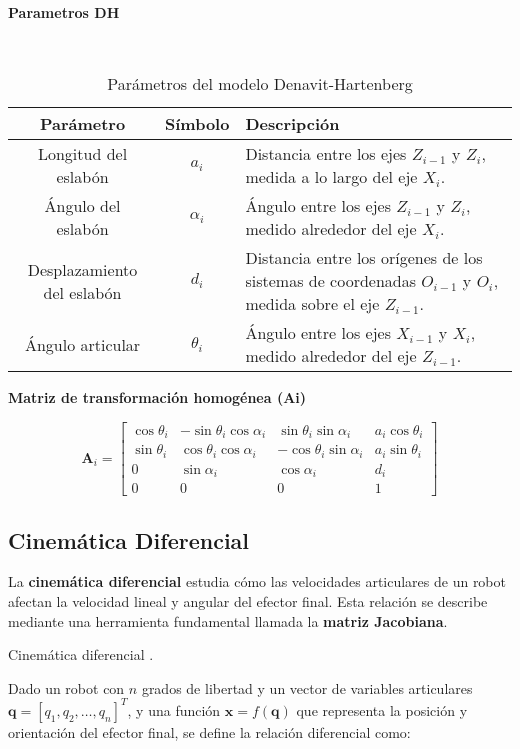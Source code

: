 \textbf{Parametros DH}
\begin{table}[H]\
	\centering
	\begin{tabular}{|c|c|p{9cm}|}
		\hline
		\textbf{Parámetro} & \textbf{Símbolo} & \textbf{Descripción} \\
		\hline
		Longitud del eslabón & $a_i$ & Distancia entre los ejes $Z_{i-1}$ y $Z_i$, medida a lo largo del eje $X_i$. \\
		\hline
		Ángulo del eslabón & $\alpha_i$ & Ángulo entre los ejes $Z_{i-1}$ y $Z_i$, medido alrededor del eje $X_i$. \\
		\hline
		Desplazamiento del eslabón & $d_i$ & Distancia entre los orígenes de los sistemas de coordenadas $O_{i-1}$ y $O_i$, medida sobre el eje $Z_{i-1}$. \\
		\hline
		Ángulo articular & $\theta_i$ & Ángulo entre los ejes $X_{i-1}$ y $X_i$, medido alrededor del eje $Z_{i-1}$. \\
		\hline
	\end{tabular}
	\caption{Parámetros del modelo Denavit-Hartenberg}
	\label{tabla:dh}
\end{table}


\textbf{Matriz de transformación homogénea (Ai)}


\[
\mathbf{A}_i =
\begin{bmatrix}
	\cos\theta_i & -\sin\theta_i\cos\alpha_i & \sin\theta_i\sin\alpha_i & a_i\cos\theta_i \\
	\sin\theta_i & \cos\theta_i\cos\alpha_i & -\cos\theta_i\sin\alpha_i & a_i\sin\theta_i \\
	0            & \sin\alpha_i              & \cos\alpha_i              & d_i \\
	0            & 0                         & 0                         & 1
\end{bmatrix}
\]



\subsection{Cinemática Diferencial}

La \textbf{cinemática diferencial} estudia cómo las velocidades articulares de un robot afectan la velocidad lineal y angular del efector final. Esta relación se describe mediante una herramienta fundamental llamada la \textbf{matriz Jacobiana}.

Cinemática diferencial \cite{roboticossCinematica}.

Dado un robot con $n$ grados de libertad y un vector de variables articulares $\boldsymbol{q} = [q_1, q_2, \dots, q_n]^T$, y una función $\boldsymbol{x} = f(\boldsymbol{q})$ que representa la posición y orientación del efector final, se define la relación diferencial como:

